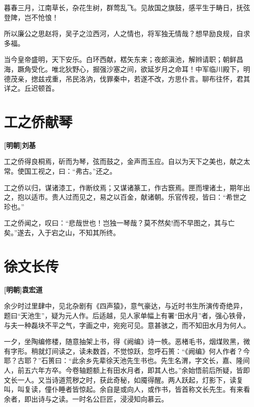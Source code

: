 \documentclass[UTF8,titlepage,oneside]{ctexbook}
\begin{document}
暮春三月，江南草长，杂花生树，群莺乱飞。见故国之旗鼓，感平生于畴日，抚弦登陴，岂不怆悢！

所以廉公之思赵将，吴子之泣西河，人之情也，将军独无情哉？想早励良规，自求多福。

当今皇帝盛明，天下安乐。白环西献，楛矢东来；夜郎滇池，解辫请职；朝鲜昌海，蹶角受化。唯北狄野心，掘强沙塞之间，欲延岁月之命耳！中军临川殿下，明德茂亲，揔兹戎重，吊民洛汭，伐罪秦中，若遂不改，方思仆言。聊布往怀，君其详之。丘迟顿首。


\chapter*{工之侨献琴}
\begin{center}
	\textbf{[明朝]刘基}
\end{center}


工之侨得良桐焉，斫而为琴，弦而鼓之，金声而玉应。自以为天下之美也，献之太常。使国工视之，曰：“弗古。”还之。


工之侨以归，谋诸漆工，作断纹焉；又谋诸篆工，作古窾焉。匣而埋诸土，期年出之，抱以适市。贵人过而见之，易之以百金，献诸朝。乐官传视，皆曰：“希世之珍也。”


工之侨闻之，叹曰：“悲哉世也！岂独一琴哉？莫不然矣!而不早图之，其与亡矣。”遂去，入于宕之山，不知其所终。



\chapter*{徐文长传}
\begin{center}
	\textbf{[明朝]袁宏道}
\end{center}


余少时过里肆中，见北杂剧有《四声猿》，意气豪达，与近时书生所演传奇绝异，题曰“天池生”，疑为元人作。后适越，见人家单幅上有署“田水月”者，强心铁骨，与夫一种磊块不平之气，字画之中，宛宛可见。意甚骇之，而不知田水月为何人。


一夕，坐陶编修楼，随意抽架上书，得《阙编》诗一帙。恶楮毛书，烟煤败黑，微有字形。稍就灯间读之，读未数首，不觉惊跃，忽呼石篑：“《阙编》何人作者？今耶？古耶？”石篑曰：“此余乡先辈徐天池先生书也。先生名渭，字文长，嘉、隆间人，前五六年方卒。今卷轴题额上有田水月者，即其人也。”余始悟前后所疑，皆即文长一人。又当诗道荒秽之时，获此奇秘，如魇得醒。两人跃起，灯影下，读复叫，叫复读，僮仆睡者皆惊起。余自是或向人，或作书，皆首称文长先生。有来看余者，即出诗与之读。一时名公巨匠，浸浸知向慕云。
\end{document}
